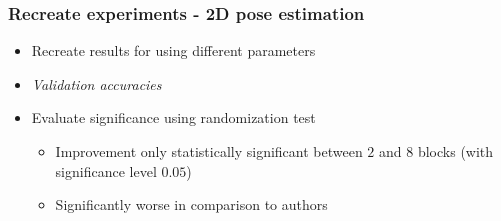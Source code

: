 \documentclass[9pt]{beamer}
\newenvironment{myframe}[1][]{%
\begin{frame}%
\frametitle{#1}
\setcounter{footnote}{0}


}{%
\end{frame}%
}
\begin{document}
\begin{myframe}[Recreate experiments - 2D pose estimation]
    \begin{itemize}
        \item Recreate results for using different parameters
        \item \textit{Validation accuracies}
        \item Evaluate significance using randomization test
        \begin{itemize}
            \item Improvement only statistically significant between $2$ and $8$ blocks (with significance level $0.05$)
            \item Significantly worse in comparison to authors
        \end{itemize}
    \end{itemize}
    \begin{figure}
        \begin{table}[]
            \small
            \centering
\end{table}
\end{figure}
\end{myframe}
\end{document}
